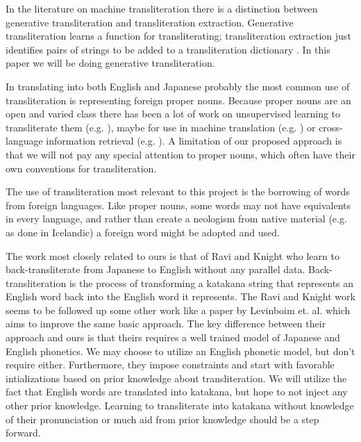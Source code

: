 \documentclass{article}
\begin{document}
In the literature on machine transliteration there is a distinction
between generative transliteration and transliteration extraction.
Generative transliteration learns a function for transliterating;
transliteration extraction just identifies pairs of strings
to be added to a transliteration dictionary
\cite{Karimi:2011:MTS:1922649.1922654}.
In this paper we will be doing generative transliteration.

In translating into both English and Japanese
probably the most common use of transliteration
is representing foreign proper nouns.
Because proper nouns are an open and varied class
there has been a lot of work on unsupervised learning to transliterate them
(e.g. \cite{Tao2006UnsupervisedNE}),
maybe for use in machine translation (e.g. \cite{Durrani2014IntegratingAU})
or cross-language information retrieval (e.g. \cite{10.1007/978-3-642-40087-2_29}).
A limitation of our proposed approach
is that we will not pay any special attention to proper nouns,
which often have their own conventions for transliteration.

The use of transliteration most relevant to this project
is the borrowing of words from foreign languages.
Like proper nouns,
some words may not have equivalents in every language,
and rather than create a neologism from native material (e.g. as done in Icelandic)
a foreign word might be adopted and used.

The work most closely related to ours is that of Ravi and Knight
\cite{Ravi2009LearningPM}
who learn to back-transliterate from Japanese to English
without any parallel data.
Back-transliteration is the process of
transforming a katakana string that represents an English word
back into the English word it represents.
The Ravi and Knight work seems to be followed up some other work
like a paper by Levinboim et. al. \cite{Levinboim2015ModelIR}
which aims to improve the same basic approach.
The key difference between their approach and ours
is that theirs requires a well trained model of Japanese and English phonetics.
We may choose to utilize an English phonetic model,
but don't require either.
Furthermore,
they impose constraints and start with favorable intializations
based on prior knowledge about transliteration.
We will utilize the fact
that English words are translated into katakana,
but hope to not inject any other prior knowledge.
Learning to transliterate into katakana
without knowledge of their pronunciation
or much aid from prior knowledge should be a step forward.
\end{document}
